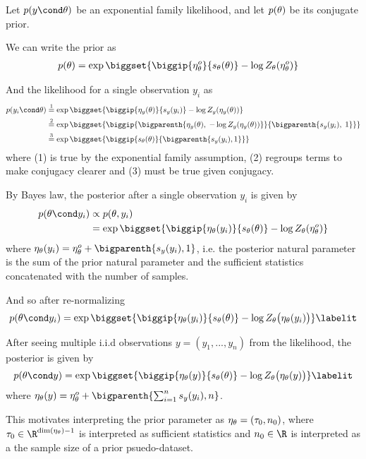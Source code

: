 Let $p(y \cond \param)$ be an exponential family likelihood, and let $p(\theta)$ be its conjugate prior. 

We can write the prior as 
\begin{align*}
p(\param ) &= \exp \biggset{\biggip{\naturalParam_\param^o}{\sufficientStatsFunction_\param (\param)} - \log Z_\param(\naturalParam_\param^o)} 
\end{align*}

And the likelihood for a single observation $y_i$ as 
\begin{align*}
p(y_i \cond \param)  & \stackrel{1}{=} \exp \biggset{ \biggip{\naturalParam_y(\param)}{\sufficientStatsFunction_y(y_i)} - \log Z_y (\naturalParam_y(\param)) } \\
& \stackrel{2}{=} \exp \biggset{ \biggip{ \bigparenth{\naturalParam_y(\param), \; - \log Z_y (\naturalParam_y(\param))}}{\bigparenth{\sufficientStatsFunction_y(y_i), \; 1}}  } \\
& \stackrel{3}{=} \exp \biggset{ \biggip{\sufficientStatsFunction_\param(\param)}{\bigparenth{\sufficientStatsFunction_y(y_i),1}}}   
\end{align*}
where (1) is true by the exponential family assumption, (2) regroups terms to make conjugacy clearer and (3) must be true given conjugacy. 


By Bayes law, the posterior after a single observation $y_i$ is given by
\begin{align*}
p(\param \cond y_i)  &\propto p(\param, y_i) \\
	&=\exp \biggset{ \biggip{ \naturalParam_\param(y_i)}{\sufficientStatsFunction_\param(\param) } - \log Z_\param(\naturalParam_\param^o)} 
\end{align*}
where $\naturalParam_\param(y_i) = \naturalParam_\param^o + \bigparenth{\sufficientStatsFunction_y(y_i),1}$, i.e. the posterior natural parameter is the sum of the prior natural parameter and the sufficient statistics concatenated with the number of samples. 

And so after re-normalizing
\begin{align*}
p(\param \cond y_i)  = \exp \biggset{ \biggip{ \naturalParam_\param(y_i)}{\sufficientStatsFunction_\param(\param) } - \log Z_\param \big(\naturalParam_\param(y_i)\big)}
\labelit \label{eqn:posterior_for_exponential_family_after_one_obs} 
\end{align*}
  
After seeing multiple i.i.d observations $y=(y_1,...,y_n)$ from the likelihood, the posterior is given by
\begin{align*}
p(\param \cond y)  = \exp \biggset{ \biggip{\naturalParam_\param(y)}{\sufficientStatsFunction_\param(\param) } - \log Z_\param \big(\naturalParam_\param(y)\big)} 
\labelit \label{eqn:posterior_for_exponential_family_after_many_obs} 
\end{align*}
where $\naturalParam_\param(y) = \naturalParam_\param^o + \bigparenth{ \sum_{i=1}^n \sufficientStatsFunction_y(y_i),n}$.

This motivates interpreting the prior parameter as $\eta_\theta = (\tau_0, n_0)$, where $\tau_0 \in \R^{\dim(\naturalParam_\param) - 1}$ is interpreted as sufficient statistics and $n_0 \in \R$ is interpreted as a the sample size of a prior psuedo-dataset. 
